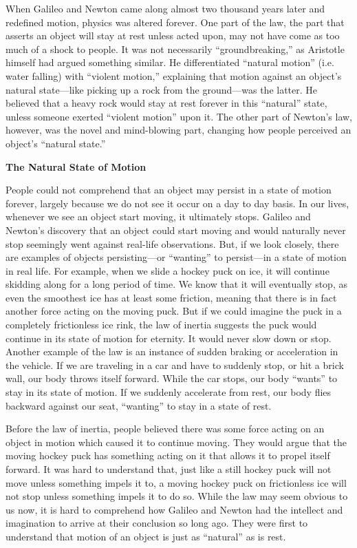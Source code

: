 When Galileo and Newton came along almost two thousand years later and redefined motion, physics was altered forever. One part of the law, the part that asserts an object will stay at rest unless acted upon, may not have come as too much of a shock to people. It was not necessarily “groundbreaking,” as Aristotle himself had argued something similar. He differentiated “natural motion” (i.e. water falling) with “violent motion,” explaining that motion against an object’s natural state—like picking up a rock from the ground—was the latter. He believed that a heavy rock would stay at rest forever in this “natural” state, unless someone exerted “violent motion” upon it. The other part of Newton’s law, however, was the novel and mind-blowing part, changing how people perceived an object’s “natural state.”

\noindent
\textbf{The Natural State of Motion}

People could not comprehend that an object may persist in a state of motion forever, largely because we do not see it occur on a day to day basis. In our lives, whenever we see an object start moving, it ultimately stops. Galileo and Newton’s discovery that an object could start moving and would naturally never stop seemingly went against real-life observations. But, if we look closely, there are examples of objects persisting—or “wanting” to persist—in a state of motion in real life. For example, when we slide a hockey puck on ice, it will continue skidding along for a long period of time. We know that it will eventually stop, as even the smoothest ice has at least some friction, meaning that there is in fact another force acting on the moving puck. But if we could imagine the puck in a completely frictionless ice rink, the law of inertia suggests the puck would continue in its state of motion for eternity. It would never slow down or stop. Another example of the law is an instance of sudden braking or acceleration in the vehicle. If we are traveling in a car and have to suddenly stop, or hit a brick wall, our body throws itself forward. While the car stops, our body “wants” to stay in its state of motion. If we suddenly accelerate from rest, our body flies backward against our seat, “wanting” to stay in a state of rest.

Before the law of inertia, people believed there was some force acting on an object in motion which caused it to continue moving. They would argue that the moving hockey puck has something acting on it that allows it to propel itself forward. It was hard to understand that, just like a still hockey puck will not move unless something impels it to, a moving hockey puck on frictionless ice will not stop unless something impels it to do so. While the law may seem obvious to us now, it is hard to comprehend how Galileo and Newton had the intellect and imagination to arrive at their conclusion so long ago. They were first to understand that motion of an object is just as “natural” as is rest.

